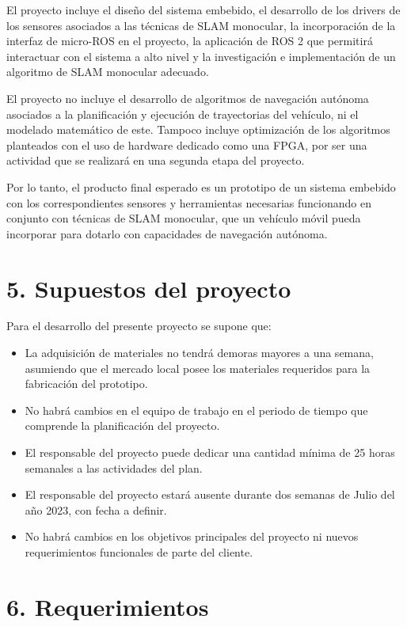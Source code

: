 \documentclass[
11pt, %
codirector, %
]{charter}
\begin{document}
El proyecto incluye el diseño del sistema embebido, el desarrollo de los drivers de los sensores asociados a las técnicas de SLAM monocular, la incorporación de la interfaz de micro-ROS en el proyecto, la aplicación de ROS 2 que permitirá interactuar con el sistema a alto nivel y la investigación e implementación de un algoritmo de SLAM monocular adecuado.

El proyecto no incluye el desarrollo de algoritmos de navegación autónoma asociados a la planificación y ejecución de trayectorias del vehículo, ni el modelado matemático de este. Tampoco incluye optimización de los algoritmos planteados con el uso de hardware dedicado como una FPGA, por ser una actividad que se realizará en una segunda etapa del proyecto.

Por lo tanto, el producto final esperado es un prototipo de un sistema embebido con los correspondientes sensores y herramientas necesarias funcionando en conjunto con técnicas de SLAM monocular, que un vehículo móvil pueda incorporar para dotarlo con capacidades de navegación autónoma.

\section{5. Supuestos del proyecto}
\label{sec:supuestos}

Para el desarrollo del presente proyecto se supone que:

\begin{itemize}
	\item La adquisición de materiales no tendrá demoras mayores a una semana, asumiendo que el mercado local posee los materiales requeridos para la fabricación del prototipo.
	\item No habrá cambios en el equipo de trabajo en el periodo de tiempo que comprende la planificación del proyecto.
	\item El responsable del proyecto puede dedicar una cantidad mínima de 25 horas semanales a las actividades del plan.
	\item El responsable del proyecto estará ausente durante dos semanas de Julio del año 2023, con fecha a definir.
	\item No habrá cambios en los objetivos principales del proyecto ni nuevos requerimientos funcionales de parte del cliente.
\end{itemize}

\section{6. Requerimientos}
\label{sec:requerimientos}
\end{document}
